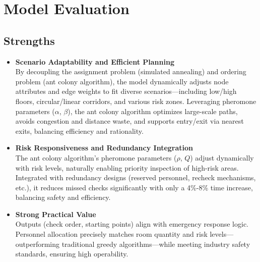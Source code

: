 \section{Model Evaluation}
\subsection{Strengths}

\begin{itemize}
    \item \textbf{Scenario Adaptability and Efficient Planning} \\
    By decoupling the assignment problem (simulated annealing) and ordering problem (ant colony algorithm), the model dynamically adjusts node attributes and edge weights to fit diverse scenarios—including low/high floors, circular/linear corridors, and various risk zones. Leveraging pheromone parameters ($\alpha$, $\beta$), the ant colony algorithm optimizes large-scale paths, avoids congestion and distance waste, and supports entry/exit via nearest exits, balancing efficiency and rationality.
    
    \item \textbf{Risk Responsiveness and Redundancy Integration} \\
    The ant colony algorithm’s pheromone parameters ($\rho$, $Q$) adjust dynamically with risk levels, naturally enabling priority inspection of high-risk areas. Integrated with redundancy designs (reserved personnel, recheck mechanisms, etc.), it reduces missed checks significantly with only a 4\%-8\% time increase, balancing safety and efficiency.
    
    \item \textbf{Strong Practical Value} \\
    Outputs (check order, starting points) align with emergency response logic. Personnel allocation precisely matches room quantity and risk levels—outperforming traditional greedy algorithms—while meeting industry safety standards, ensuring high operability.
\end{itemize}

